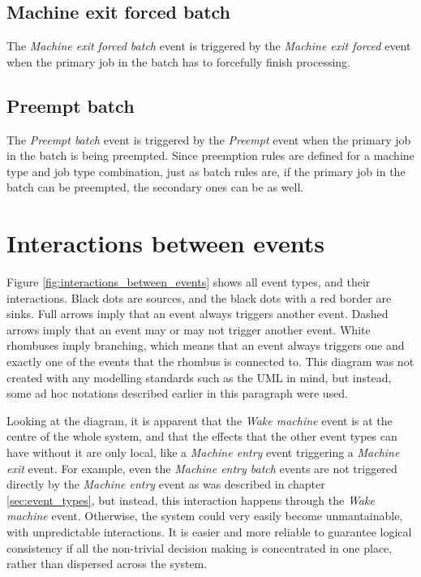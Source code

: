 \subsection{Machine exit forced batch}
The \textit{Machine exit forced batch} event is triggered by the \textit{Machine exit forced} event when the primary job in the batch has to forcefully finish processing.

\subsection{Preempt batch}
The \textit{Preempt batch} event is triggered by the \textit{Preempt} event when the primary job in the batch is being preempted. Since preemption rules are defined for a machine type and job type combination, just as batch rules are, if the primary job in the batch can be preempted, the secondary ones can be as well.

\section{Interactions between events}

Figure \ref{fig:interactions_between_events} shows all event types, and their interactions. Black dots are sources, and the black dots with a red border are sinks. Full arrows imply that an event always triggers another event. Dashed arrows imply that an event may or may not trigger another event. White rhombuses imply branching, which means that an event always triggers one and exactly one of the events that the rhombus is connected to. This diagram was not created with any modelling standards such as the UML in mind, but instead, some ad hoc notations described earlier in this paragraph were used. 

Looking at the diagram, it is apparent that the \textit{Wake machine} event is at the centre of the whole system, and that the effects that the other event types can have without it are only local, like a \textit{Machine entry} event triggering a \textit{Machine exit} event. For example, even the \textit{Machine entry batch} events are not triggered directly by the \textit{Machine entry} event as was described in chapter \ref{sec:event_types}, but instead, this interaction happens through the \textit{Wake machine} event. Otherwise, the system could very easily become unmantainable, with unpredictable interactions. It is easier and more reliable to guarantee logical consistency if all the non-trivial decision making is concentrated in one place, rather than dispersed across the system.

